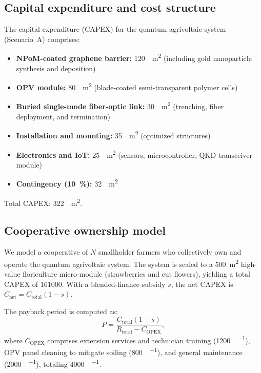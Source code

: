 \documentclass[11pt,a4paper]{article}
\begin{document}
\subsection{Capital expenditure and cost structure}

The capital expenditure (CAPEX) for the quantum agrivoltaic system (Scenario~A) comprises:
\begin{itemize}
\item \textbf{NPoM-coated graphene barrier:} \qty{120}{\per\m\squared} (including gold nanoparticle synthesis and deposition)
\item \textbf{OPV module:} \qty{80}{\per\m\squared} (blade-coated semi-transparent polymer cells)
\item \textbf{Buried single-mode fiber-optic link:} \qty{30}{\per\m\squared} (trenching, fiber deployment, and termination)
\item \textbf{Installation and mounting:} \qty{35}{\per\m\squared} (optimized structures)
\item \textbf{Electronics and IoT:} \qty{25}{\per\m\squared} (sensors, microcontroller, QKD transceiver module)
\item \textbf{Contingency (\qty{10}{\percent}):} \qty{32}{\per\m\squared}
\end{itemize}
Total CAPEX: \qty{322}{\per\m\squared}.

\subsection{Cooperative ownership model}

We model a cooperative of $N$ smallholder farmers who collectively own and operate the quantum agrivoltaic system.
The system is scaled to a \qty{500}{\m\squared} high-value floriculture micro-module (strawberries and cut flowers), yielding a total CAPEX of \qty{161000}{\USD}.
With a blended-finance subsidy $s$, the net CAPEX is $C_{\mathrm{net}} = C_{\mathrm{total}}(1 - s)$.

The payback period is computed as:
\begin{equation}
P = \frac{C_{\mathrm{total}} (1 - s)}{R_{\mathrm{total}} - C_{\mathrm{OPEX}}},
\label{eq:SI_payback}
\end{equation}
where $C_{\mathrm{OPEX}}$ comprises extension services and technician training (\qty{1200}{\USD\per\yr}), OPV panel cleaning to mitigate soiling (\qty{800}{\USD\per\yr}), and general maintenance (\qty{2000}{\USD\per\yr}), totaling \qty{4000}{\USD\per\yr}.
\end{document}
